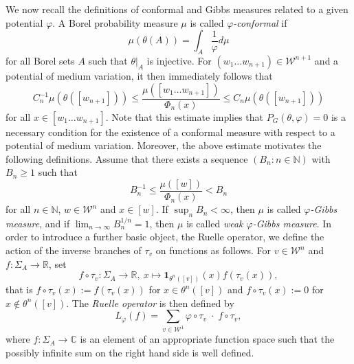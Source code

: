 \documentclass[10pt]{article}
\theoremstyle{mystyle}
\newcommand{\R}{\mathbb{R}}
\newcommand{\N}{\mathbb{N}}
\newcommand{\cW}{\mathcal{W}}
\newcommand{\te}{{\theta}}
\newcommand{\Sig}{{\Sigma}}
\newcommand{\1}{\mathbf{1}}
\begin{document}
We now recall the definitions of conformal and Gibbs measures related to a given potential $\varphi$.  A Borel probability measure $\mu$ is called \emph{$\varphi$-conformal} if 
\[ \mu(\te(A)) = \int_A \frac{1}{\varphi}d\mu  \] 
 for all Borel sets $A$ such that $\te|_A$ is injective. For $(w_1\ldots w_{n+1}) \in \cW^{n+1}$ and a potential of medium variation, it then immediately follows that  
\begin{equation}\label{eq:conformal_estimate} C_n^{-1} \mu(\te([w_{n+1}])) \leq \frac{\mu([w_1\ldots w_{n+1}])}{\Phi_n(x)} \leq C_n \mu(\te([w_{n+1}]))\end{equation} 
for all $x \in [w_1\ldots w_{n+1}]$. Note that this estimate implies that $P_G(\te,\varphi)=0$ is a necessary condition for the existence of a conformal measure  with respect to a potential of medium variation. Moreover, the above estimate motivates the following definitions. Assume that there exists a sequence $(B_n:n \in \N)$ with $B_n \geq 1$ such that
\begin{equation}\label{eq:Gibbs} B_n^{-1}\leq \frac{\mu([w])}{\Phi_n (x)}<B_n \end{equation} 
for all $n \in \N$, $w \in \cW^n$ and $x \in [w]$. If $\sup_n B_n < \infty$, then $\mu$ is called \emph{$\varphi$-Gibbs measure}, and if $\lim_{n\to \infty} B_n^{1/n}=1$, then $\mu$ is called \emph{weak $\varphi$-Gibbs measure}. In order to introduce a further basic object, the Ruelle operator, we define the action of the inverse branches of $\tau_v$ on functions as follows. For $v \in \cW^n$ and $f : \Sigma_A \to \R$, set 
\[f\circ \tau_v : \Sig_A \to \R, \  x \mapsto \1_{\te^n([v])}(x) f(\tau_v(x)),\]
that is $f\circ \tau_v(x) := f(\tau_v(x))$ for  $x \in \te^n([v])$ and $f\circ \tau_v(x) := 0$ for  $x \notin \te^n([v])$. The \emph{Ruelle operator} is then defined by 
\[ L_\varphi (f) = \sum_{v \in \cW^1} \varphi\circ\tau_v \; \cdot \;f\circ\tau_v, \]
where $f : \Sigma_A \to \mathbb{C}$ is an element of an appropriate function space such that the possibly infinite sum on the right hand side is well defined.
\end{document}
